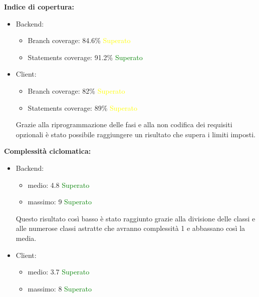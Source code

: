 			\begin{description}
				\item \textbf{Indice di copertura:}				
				\begin{itemize}
						\item Backend:
							\begin{itemize}
								\item Branch coverage: 84.6\% \textcolor{yellow}{Superato}
								\item Statements coverage: 91.2\% \textcolor{green}{Superato}
							\end{itemize}
						\item Client:
							\begin{itemize}
								\item Branch coverage: 82\% \textcolor{yellow}{Superato}
								\item Statements coverage: 89\% \textcolor{yellow}{Superato}
							\end{itemize}
						Grazie alla riprogrammazione delle fasi e alla non codifica dei requisiti opzionali è stato possibile raggiungere un risultato che supera i limiti imposti.
					\end{itemize}
				
				\item \textbf{Complessità ciclomatica:}
					\begin{itemize}
						\item Backend:
							\begin{itemize}
								\item medio: 4.8 \textcolor{green}{Superato}
								\item massimo: 9 \textcolor{green}{Superato}
							\end{itemize}
						Questo risultato così basso è stato raggiunto grazie alla divisione delle classi e alle numerose classi astratte che avranno complessità 1 e abbassano così la media.
						\item Client:
							\begin{itemize}
								\item medio: 3.7 \textcolor{green}{Superato}
								\item massimo: 8 \textcolor{green}{Superato}
							\end{itemize}
					\end{itemize}
						

\end{description}
